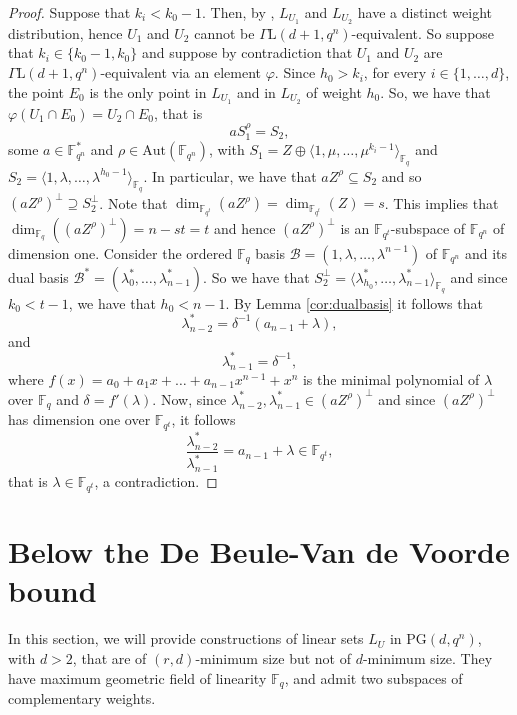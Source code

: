 \documentclass[11pt]{article}
\theoremstyle{definition}
\newcommand{\fqn}{\mathbb{F}_{q^n}}
\newcommand{\F}{{\mathbb F}}
\newcommand{\fq}{{\mathbb F}_{q}}
\newcommand{\PG}{\mathrm{PG}}
\begin{document}
\begin{proof}
Suppose that $k_i<k_0-1$. Then, by ,
$L_{U_1}$ and $L_{U_2}$ have a distinct weight distribution, hence $U_1$ and $U_2$ cannot be $\Gamma\mathrm{L}(d+1,q^n)$-equivalent. So suppose that $k_i \in \{k_0-1,k_0\}$ and suppose by contradiction that $U_1$ and $U_2$ are $\Gamma\mathrm{L}(d+1,q^n)$-equivalent via an element $\varphi$.
Since $h_0>k_i$, for every $i \in \{1,\ldots,d\}$, %
the point $E_0$ is the only point in $L_{U_1}$ and in $L_{U_2}$ of weight $h_0$. So, we have that $\varphi(U_1 \cap E_0)=U_2\cap E_0$, that is
\[ aS_1^{\rho}=S_2, \]
some $a \in \fqn^*$ and $\rho \in \mathrm{Aut}(\fqn)$, with $S_1=Z \oplus \langle 1,\mu,\ldots,\mu^{k_i-1} \rangle_{\F_q}$ and $S_2=\langle 1,\lambda,\ldots,\lambda^{h_0-1} \rangle_{\F_q}$.
In particular, we have that $aZ^\rho \subseteq S_2$ and so $(aZ^\rho)^\perp \supseteq S_2^\perp$. Note that $\dim_{\F_{q^{t}}}(aZ^{\rho})=\dim_{\F_{q^{t}}}(Z)=s$. %
This implies that $\dim_{\fq}((aZ^\rho)^\perp)=n-st=t$ and 
hence $(aZ^\rho)^\perp$ is an $\F_{q^{t}}$-subspace of $\fqn$ of dimension one.
Consider the ordered $\F_q$ basis $\mathcal{B}=(1,\lambda,\ldots,\lambda^{n-1})$ of $\F_{q^n}$ and its dual basis $\mathcal{B}^*=(\lambda_0^*,\ldots,\lambda_{n-1}^*)$.
So we have that $S_2^\perp=\langle \lambda_{h_0}^*,\ldots,\lambda_{n-1}^* \rangle_{\fq}$ and since $k_0<t-1$, we have that $h_0<n-1$. By Lemma \ref{cor:dualbasis} it follows that
\[ \lambda_{n-2}^*=\delta^{-1}(a_{n-1}+\lambda), \]
and
\[ \lambda_{n-1}^*=\delta^{-1}, \]
where $f(x)=a_0+a_1x+\ldots+a_{n-1}x^{n-1}+x^n$ is the minimal polynomial of $\lambda$ over $\fq$ and $\delta=f'(\lambda)$.
Now, since $\lambda_{n-2}^*,\lambda_{n-1}^* \in (aZ^\rho)^\perp$ and since $(aZ^\rho)^\perp$ has dimension one over $\F_{q^{t}}$, it follows
\[ \frac{\lambda_{n-2}^*}{\lambda_{n-1}^*}=a_{n-1}+\lambda \in \F_{q^{t}}, \]
that is $\lambda \in \F_{q^{t}}$, a contradiction.
\end{proof}


\section{Below the De Beule-Van de Voorde bound}
 \label{sec:BelowBound}

In this section, we will provide constructions of linear sets $L_U$ in $ \PG(d,q^n)$, with $d>2$, that are of $(r,d)$-minimum size but not of $d$-minimum size.
They have maximum geometric field of linearity $\F_q$, and admit two subspaces of complementary weights.
\end{document}
